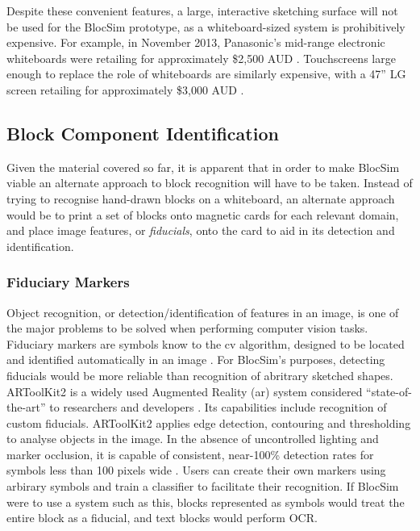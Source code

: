 Despite these convenient features, a large, interactive sketching surface will not be used for the BlocSim prototype, as a whiteboard-sized system is prohibitively expensive. For example, in November 2013, Panasonic’s mid-range electronic whiteboards were retailing for approximately \$2,500 AUD \cite{panasonic}. Touchscreens large enough to replace the role of whiteboards are similarly expensive, with a 47” LG screen retailing for approximately \$3,000 AUD \cite{ledLcd}.


\subsection{Block Component Identification}

Given the material covered so far, it is apparent that in order to make BlocSim viable an alternate approach to block recognition will have to be taken. Instead of trying to recognise hand-drawn blocks on a whiteboard, an alternate approach would be to print a set of blocks onto magnetic cards for each relevant domain, and place image features, or \textit{fiducials}, onto the card to aid in its detection and identification.
\\


\subsubsection{Fiduciary Markers}

Object recognition, or detection/identification of features in an image, is one of the major problems to be solved when performing computer vision tasks. Fiduciary markers are symbols know to the \gls{cv} algorithm, designed to be located and identified automatically in an image \cite{artag}. For BlocSim's purposes, detecting fiducials would be more reliable than recognition of abritrary sketched shapes.
\\

ARToolKit2 is a widely used Augmented Reality (\gls{ar}) system considered “state-of-the-art” to researchers and developers \cite{artoolkit}. Its capabilities include recognition of custom fiducials. ARToolKit2 applies edge detection, contouring and thresholding to analyse objects in the image. In the absence of uncontrolled lighting and marker occlusion, it is capable of consistent, near-100\% detection rates for symbols less than 100 pixels wide \cite{bestFiducial}. Users can create their own markers using arbirary symbols and train a classifier to facilitate their recognition. If BlocSim were to use a system such as this, blocks represented as symbols would treat the entire block as a fiducial, and text blocks would perform OCR.
\\

